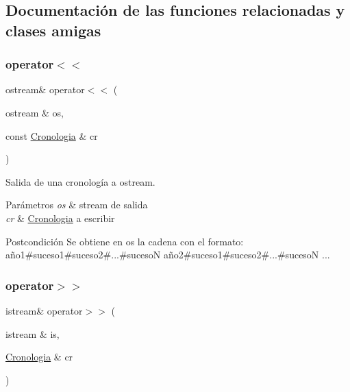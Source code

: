 \subsection{Documentación de las funciones relacionadas y clases amigas}
\mbox{\label{classCronologia_ae4e05c9547fb694b0413f46f8d5542a9}} 
\subsubsection{\texorpdfstring{operator$<$$<$}{operator<<}}
{\footnotesize\ttfamily ostream\& operator$<$$<$ (\begin{DoxyParamCaption}\item[{ostream \&}]{os,  }\item[{const \hyperlink{classCronologia}{Cronologia} \&}]{cr }\end{DoxyParamCaption})\hspace{0.3cm}{\ttfamily [friend]}}



Salida de una cronología a ostream. 


\begin{DoxyParams}{Parámetros}
{\em os} & stream de salida \\
\hline
{\em cr} & \hyperlink{classCronologia}{Cronologia} a escribir \\
\hline
\end{DoxyParams}
\begin{DoxyPostcond}{Postcondición}
Se obtiene en os la cadena con el formato\+: año1\#suceso1\#suceso2\#...\#sucesoN año2\#suceso1\#suceso2\#...\#sucesoN ... 
\end{DoxyPostcond}
\mbox{\label{classCronologia_a3436f2476c2b5845bc88dfbe6d81b8cd}} 
\subsubsection{\texorpdfstring{operator$>$$>$}{operator>>}}
{\footnotesize\ttfamily istream\& operator$>$$>$ (\begin{DoxyParamCaption}\item[{istream \&}]{is,  }\item[{\hyperlink{classCronologia}{Cronologia} \&}]{cr }\end{DoxyParamCaption})\hspace{0.3cm}{\ttfamily [friend]}}



